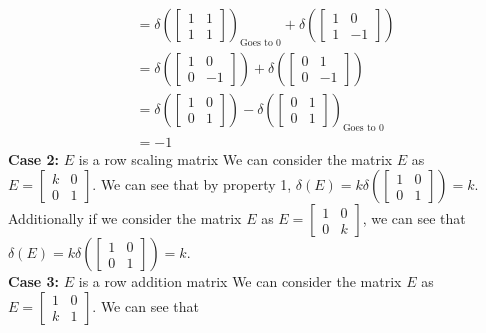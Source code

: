 \documentclass[answers,12pt,addpoints]{exam}
\begin{document}
\begin{questions}
\begin{solution}
\begin{align*}
            &= \delta\left(\begin{bmatrix} 1 & 1 \\ 1 & 1 \end{bmatrix}\right)_{\text{Goes to } 0} + \delta\left(\begin{bmatrix} 1 & 0 \\ 1 & -1 \end{bmatrix}\right)\\
            &= \delta\left(\begin{bmatrix} 1 & 0 \\ 0 & -1 \end{bmatrix}\right) + \delta\left(\begin{bmatrix} 0 & 1 \\ 0 & -1 \end{bmatrix}\right)\\
            &= \delta\left(\begin{bmatrix} 1 & 0 \\ 0 & 1 \end{bmatrix}\right) - \delta\left(\begin{bmatrix} 0 & 1 \\ 0 & 1 \end{bmatrix}\right)_{\text{Goes to } 0}\\
            &= -1
        \end{align*}
        \textbf{Case 2:} $E$ is a row scaling matrix
        We can consider the matrix $E$ as $E = \begin{bmatrix} k & 0 \\ 0 & 1 \end{bmatrix}$. We can see that by property 1, $\delta(E) = k\delta\left(\begin{bmatrix} 1 & 0 \\ 0 & 1 \end{bmatrix}\right) = k$.\\
        Additionally if we consider the matrix $E$ as $E = \begin{bmatrix} 1 & 0 \\ 0 & k \end{bmatrix}$, we can see that $\delta(E) = k\delta\left(\begin{bmatrix} 1 & 0 \\ 0 & 1 \end{bmatrix}\right) = k$.\\
        \textbf{Case 3:} $E$ is a row addition matrix
        We can consider the matrix $E$ as $E = \begin{bmatrix} 1 & 0 \\ k & 1 \end{bmatrix}$. We can see that 

\end{solution}
\end{questions}
\end{document}
